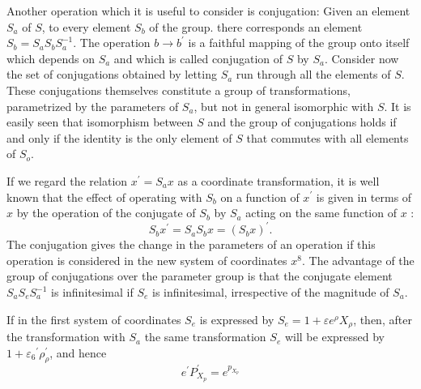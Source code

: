 Another operation which it is useful to consider is conjugation: Given an
element \(S_a\) of \(S\), to every element \(S_b\) of the group. there
corresponds an element \(S_b=S_a S_b S_a^{-1}\). The operation
\(b \rightarrow b^{\prime}\) is a faithful mapping of the group onto itself which depends on
\(S_a\) and which is called conjugation of \(S\) by \(S_a\). Consider now the
set of conjugations obtained by letting \(S_a\) run through all the elements of
\(S\). These conjugations themselves constitute a group of transformations,
parametrized by the parameters of \(S_a\), but not in general isomorphic with
\(S\). It is easily seen that isomorphism between \(S\) and the group of
conjugations holds if and only if the identity is the only element of \(S\)
that commutes with all elements of \(S_o\).

If we regard the relation \(x^{\prime}=S_a x\) as a coordinate transformation,
it is well known that the effect of operating with \(S_b\) on a function of
\(x^{\prime}\) is given in terms of \(x\) by the operation of the conjugate
of \(S_b\) by \(S_a\) acting on the same function of \(x\) :
\[
S_b x^{\prime}=S_a S_b x=\left(S_b x\right)^{\prime}.
\]
The conjugation gives the change in the parameters of an operation if this
operation is considered in the new system of coordinates \(x^8\). The advantage
of the group of conjugations over the parameter group is that the conjugate
element \(S_a S_e S_a^{-1}\) is infinitesimal if \(S_e\) is infinitesimal,
irrespective of the magnitude of \(S_a\).

If in the first system of coordinates \(S_e\) is expressed by
\(S_e=1+\varepsilon e^\rho X_\rho\), then, after the transformation with
\(S_a\) the same transformation \(S_e\) will be expressed by
\(1+\varepsilon_6{ }^{\prime} \rho_\rho^{\prime}\), and hence
\begin{equation}\label{eq:17}
e^{\prime} P_{X_p}^{\prime}=e^{p_{X_p}}
\end{equation}

